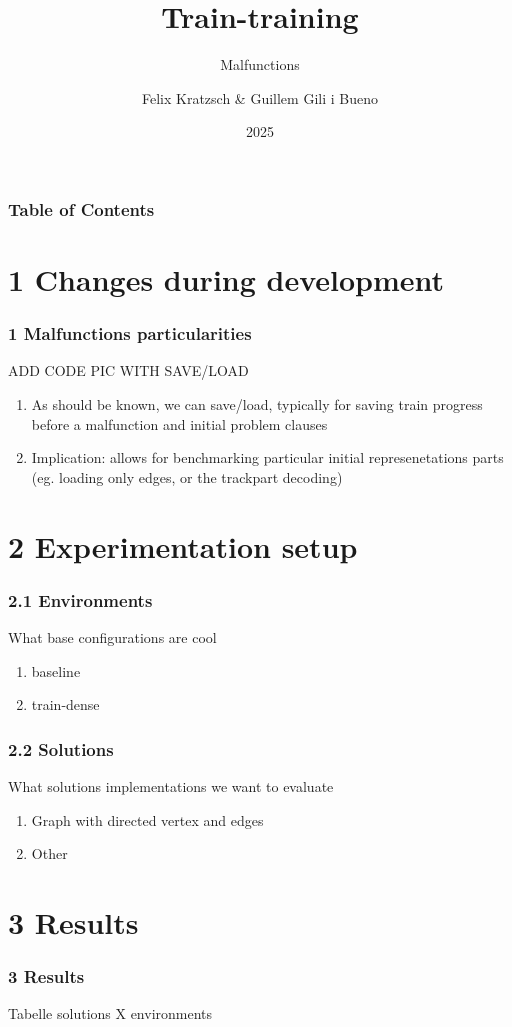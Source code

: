 \documentclass{beamer}
\title{Train-training}
\subtitle{Malfunctions}
\author{Felix  Kratzsch \& Guillem Gili i Bueno  }
\institute{Potsdam University - Railway Scheudling }
\date{2025}
\begin{document}
\frame{\titlepage}

\begin{frame}[label=toc]
\frametitle{Table of Contents}
\tableofcontents
\end{frame} 


\section{1 Changes during development}

\begin{frame}
	\frametitle{1  Malfunctions particularities}
	ADD CODE PIC WITH SAVE/LOAD
\begin{enumerate}
	\item{As should be known, we can save/load, typically for saving train progress before a malfunction and initial problem clauses} 
	\item{Implication: allows for benchmarking particular initial represenetations parts (eg. loading only edges, or the trackpart decoding)} 
\end{enumerate}
\end{frame}


\section{2 Experimentation setup}


\begin{frame}
	\frametitle{2.1  Environments }
	What base configurations are cool
	\begin{enumerate}
		\item{baseline} 
		\item{train-dense} 
	\end{enumerate}
	
\end{frame}
\begin{frame}
	\frametitle{2.2 Solutions }
	What solutions implementations we want to evaluate
	\begin{enumerate}
		\item{Graph with directed vertex and edges} 
		\item{Other} 
	\end{enumerate}
	
\end{frame}


\section{3 Results}


\begin{frame}
	\frametitle{3  Results}
	Tabelle solutions X environments

\end{frame}
\end{document}
